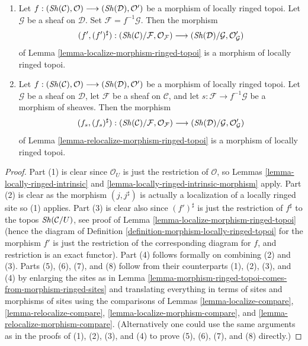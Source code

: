 \begin{lemma}
\begin{enumerate}
on $\mathcal{C}$. Then the morphism
$$
(j, j^\sharp) :
(\Sh(\mathcal{C})/\mathcal{G}, \mathcal{O}_\mathcal{G})
\longrightarrow
(\Sh(\mathcal{C})/\mathcal{F}, \mathcal{O}_\mathcal{F})
$$
of
Lemma \ref{lemma-relocalize-ringed-topos}
is a morphism of locally ringed topoi.
\item Let
$f :
(\mathop{\mathit{Sh}}\nolimits(\mathcal{C}), \mathcal{O})
\longrightarrow
(\mathop{\mathit{Sh}}\nolimits(\mathcal{D}), \mathcal{O}')$
be a morphism of locally ringed topoi. Let $\mathcal{G}$ be a sheaf
on $\mathcal{D}$. Set $\mathcal{F} = f^{-1}\mathcal{G}$.
Then the morphism
$$
(f', (f')^\sharp) :
(\mathop{\mathit{Sh}}\nolimits(\mathcal{C})/\mathcal{F}, \mathcal{O}_\mathcal{F})
\longrightarrow
(\mathop{\mathit{Sh}}\nolimits(\mathcal{D})/\mathcal{G}, \mathcal{O}'_\mathcal{G})
$$
of
Lemma \ref{lemma-localize-morphism-ringed-topoi}
is a morphism of locally ringed topoi.
\item  Let
$f :
(\mathop{\mathit{Sh}}\nolimits(\mathcal{C}), \mathcal{O})
\longrightarrow
(\mathop{\mathit{Sh}}\nolimits(\mathcal{D}), \mathcal{O}')$
be a morphism of locally ringed topoi. Let $\mathcal{G}$ be a sheaf
on $\mathcal{D}$, let $\mathcal{F}$ be a sheaf on $\mathcal{C}$, and
let $s : \mathcal{F} \to f^{-1}\mathcal{G}$ be a morphism of sheaves.
Then the morphism
$$
(f_s, (f_s)^\sharp) :
(\mathop{\mathit{Sh}}\nolimits(\mathcal{C})/\mathcal{F}, \mathcal{O}_\mathcal{F})
\longrightarrow
(\mathop{\mathit{Sh}}\nolimits(\mathcal{D})/\mathcal{G}, \mathcal{O}'_\mathcal{G})
$$
of
Lemma \ref{lemma-relocalize-morphism-ringed-topoi}
is a morphism of locally ringed topoi.
\end{enumerate}
\end{lemma}

\begin{proof}
Part (1) is clear since $\mathcal{O}_U$ is just the
restriction of $\mathcal{O}$, so
Lemmas \ref{lemma-locally-ringed-intrinsic} and
\ref{lemma-locally-ringed-intrinsic-morphism}
apply. Part (2) is clear as the morphism $(j, j^\sharp)$
is actually a localization of a locally ringed site so (1) applies.
Part (3) is clear also since $(f')^\sharp$ is just the
restriction of $f^\sharp$ to the topos
$\mathop{\mathit{Sh}}\nolimits(\mathcal{C}/U)$, see proof of
Lemma \ref{lemma-localize-morphism-ringed-topoi}
(hence the diagram of
Definition \ref{definition-morphism-locally-ringed-topoi}
for the morphism $f'$ is just the restriction of the corresponding
diagram for $f$, and restriction is an exact functor).
Part (4) follows formally on combining (2) and (3).
Parts (5), (6), (7), and (8) follow from their counterparts
(1), (2), (3), and (4) by enlarging the sites as in
Lemma \ref{lemma-morphism-ringed-topoi-comes-from-morphism-ringed-sites}
and translating everything in terms of sites and morphisms of sites using
the comparisons of
Lemmas \ref{lemma-localize-compare},
\ref{lemma-relocalize-compare},
\ref{lemma-localize-morphism-compare}, and
\ref{lemma-relocalize-morphism-compare}.
(Alternatively one could use the same arguments as in the proofs
of (1), (2), (3), and (4) to prove (5), (6), (7), and (8) directly.)
\end{proof}






